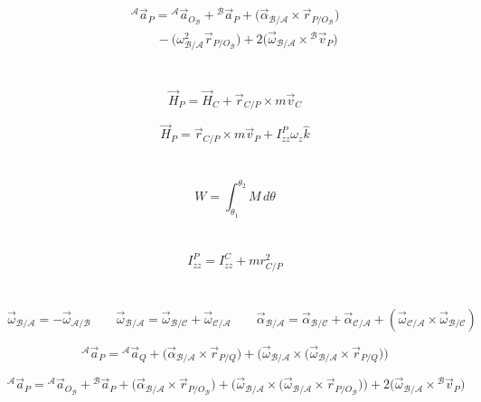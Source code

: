 \documentclass{article}
\begin{document}
\begin{multicols}{2}[\raggedcolumns]
\[
\begin{split}
    {}^\mathcal A\vec a_P={}^\mathcal A\vec a_{O_\mathcal B}+{}^\mathcal B\vec a_P+\bigl(\vec\alpha_{\mathcal B/\mathcal A}\times\vec r_{P/O_\mathcal B}\bigr) \\
    \qquad-\bigl(\omega_{\mathcal B/\mathcal A}^2\vec r_{P/O_\mathcal B}\bigr)+2\bigl(\vec\omega_{\mathcal B/\mathcal A}\times{}^\mathcal B\vec v_P\bigr)
\end{split}
\]

\section*{}
\[
\vec H_P=\vec H_C+\vec r_{C/P}\times m\vec v_C
\]

\[
\vec H_P=\vec r_{C/P}\times m\vec v_P+I_{zz}^P\omega_z\hat k
\]

\section*{}

\[
W=\int_{\theta_1}^{\theta_2}M\,d\theta
\]

\section*{}
\[
I_{zz}^P=I_{zz}^C+mr_{C/P}^2
\]

\end{multicols}

\section*{}

\[
\vec\omega_{\mathcal B/\mathcal A}=-\vec\omega_{\mathcal A/\mathcal B} \qquad
\vec\omega_{\mathcal B/\mathcal A}=\vec\omega_{\mathcal B/\mathcal C}+\vec\omega_{\mathcal C/\mathcal A} \qquad
\vec\alpha_{\mathcal B/\mathcal A}=\vec\alpha_{\mathcal B/\mathcal C}+\vec\alpha_{\mathcal C/\mathcal A}+(\vec\omega_{\mathcal C/\mathcal A}\times\vec\omega_{\mathcal B/\mathcal C})
\]

\[
{}^\mathcal A\vec a_P={}^\mathcal A\vec a_Q+\bigl(\vec\alpha_{\mathcal B/\mathcal A}\times\vec r_{P/Q}\bigr)+\bigl(\vec\omega_{\mathcal B/\mathcal A}\times\bigl(\vec\omega_{\mathcal B/\mathcal A}\times\vec r_{P/Q}\bigr)\bigr)
\]

\[
{}^\mathcal A\vec a_P={}^\mathcal A\vec a_{O_\mathcal B}+{}^\mathcal B\vec a_P+\bigl(\vec\alpha_{\mathcal B/\mathcal A}\times\vec r_{P/O_\mathcal B}\bigr)+\bigl(\vec\omega_{\mathcal B/\mathcal A}\times\bigl(\vec\omega_{\mathcal B/\mathcal A}\times\vec r_{P/O_\mathcal B}\bigr)\bigr)+2\bigl(\vec\omega_{\mathcal B/\mathcal A}\times{}^\mathcal B\vec v_P\bigr)
\]
\end{document}
